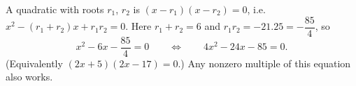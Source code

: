 A quadratic with roots $r_1$, $r_2$ is $(x-r_1)(x-r_2)=0$, i.e.\ $x^2-(r_1+r_2)x+r_1r_2=0$. Here $r_1+r_2=6$ and $r_1r_2=-21.25=-\dfrac{85}{4}$, so
\[
x^2-6x-\dfrac{85}{4}=0\qquad\Longleftrightarrow\qquad\boxed{4x^2-24x-85=0}.
\]
(Equivalently $(2x+5)(2x-17)=0$.) Any nonzero multiple of this equation also works.
